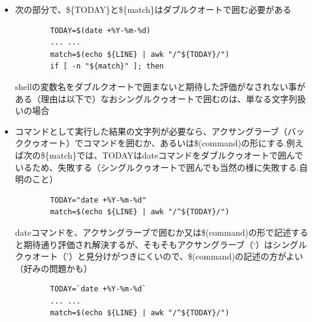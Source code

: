 \documentclass[12pt,a4j]{jsbook}
\begin{document}
\begin{itemize}
	\item 次の部分で、\$\{TODAY\}と\$\{match\}はダブルクオートで囲む必要がある
	\begin{verbatim}
		TODAY=$(date +%Y-%m-%d)
		... ...
		match=$(echo ${LINE} | awk "/^${TODAY}/")
		if [ -n "${match}" ]; then
	\end{verbatim}
	shellの変数名をダブルクオートで囲まないと期待した評価がなされない事がある（理由は以下で）なおシングルクゥオートで囲むのは、単なる文字列扱いの場合
	\item コマンドとして実行した結果の文字列が必要なら、アクサングラーブ（バッククゥオート）でコマンドを囲むか、あるいは\$(command)の形にする.例えば次の\$\{match\}では、TODAYはdateコマンドをダブルクゥオートで囲んでいるため、失敗する（シングルクゥオートで囲んでも当然の様に失敗する.自明のこと）
	\begin{verbatim}
		TODAY="date +%Y-%m-%d"
		match=$(echo ${LINE} | awk "/^${TODAY}/")
	\end{verbatim}
	dateコマンドを、アクサングラーブで囲むか又は\$(command)の形で記述すると期待通り評価され解決するが、そもそもアクサングラーブ（`）はシングルクゥオート（'）と見分けがつきにくいので、\$(command)の記述の方がよい（好みの問題かも）
	\begin{verbatim}
		TODAY=`date +%Y-%m-%d`
		... ...
		match=$(echo ${LINE} | awk "/^${TODAY}/")
	\end{verbatim}



\end{itemize}
\end{document}
